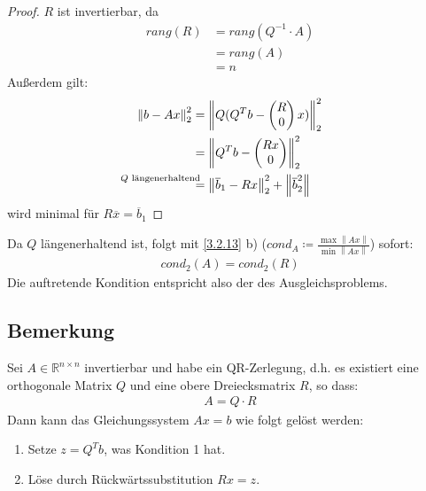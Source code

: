 \documentclass[ngerman,fontsize=11pt, paper=a4, parskip=half, titlepage=true, toc=bib]{scrbook}
\newcommand{\Renn}{\mathds{R}^{n\times n}}
\newcommand{\nn}[1]{\left\| #1 \right\|}
\begin{document}
  \begin{proof} $R$ ist invertierbar, da 
    \begin{align*}
      rang(R) &= rang(Q^{-1}\cdot A) \\	
              & = rang(A) \\
              &= n
    \end{align*}
    Außerdem gilt:
    \begin{align*}
      \nn{b-Ax}_2^2 & = \nn{Q(Q^Tb-\begin{pmatrix}R\\0\end{pmatrix}x)}_2^2 \\
                    &=  \nn{Q^Tb-\begin{pmatrix}Rx\\0\end{pmatrix}}_2^2  \\
                    &\overset{\mathllap{\text{$Q$ längenerhaltend}}}{=}
                      \nn{\overline{b}_1 - Rx}_2^2  + \nn{\overline{b}_2^2}
    \end{align*}
    wird minimal für $R\overline{x} = \overline{b}_1$
  \end{proof}
  
  Da $Q$ längenerhaltend ist, folgt mit \ref{3.2.13} b)
  ($cond_A \coloneqq \frac{\max \nn{Ax}}{\min \nn{Ax}}$)
  sofort:
  \begin{gather*}
    cond_2(A) = cond_2(R)
  \end{gather*}
  Die auftretende Kondition entspricht also der des Ausgleichsproblems.
  
  
  \subsection{Bemerkung}
  Sei $A\in \Renn$ invertierbar und habe ein QR-Zerlegung, d.h. es existiert
  eine orthogonale Matrix $Q$ und eine obere Dreiecksmatrix $R$, so dass:
  \begin{gather*}
    A= Q\cdot R
  \end{gather*}
  Dann kann das Gleichungssystem $Ax=b$ wie folgt gelöst werden:
  \begin{enumerate}[1.]
  \item Setze $z=Q^Tb$, was Kondition 1 hat.
  \item Löse durch Rückwärtssubstitution $Rx=z$.
  \end{enumerate}
  
  
\end{document}
